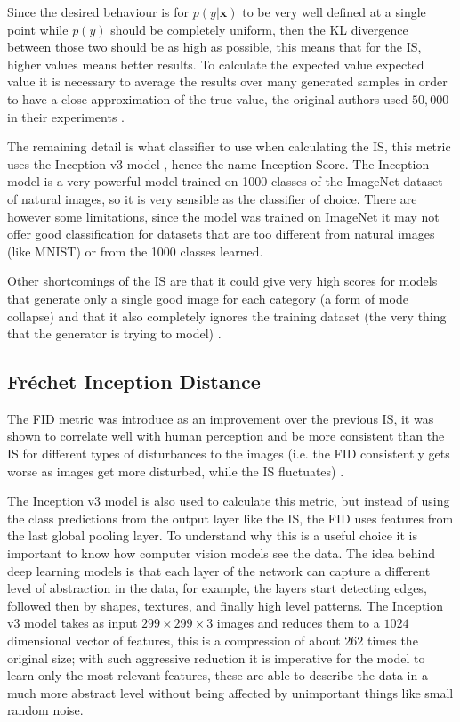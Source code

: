 Since the desired behaviour is for $p(y | \bm{x})$ to be very well defined at a single point while $p(y)$ should be completely uniform, then the KL divergence between those two should be as high as possible, this means that for the \gls{IS}, higher values means better results. To calculate the expected value expected value it is necessary to average the results over many generated samples in order to have a close approximation of the true value, the original authors used $50,000$ in their experiments \cite{improvedGANS2016}.

The remaining detail is what classifier to use when calculating the \gls{IS}, this metric uses the Inception v3 model \cite{inceptionV3_2015}, hence the name Inception Score. The Inception model is a very powerful model trained on 1000 classes of the ImageNet dataset of natural images, so it is very sensible as the classifier of choice. There are however some limitations, since the model was trained on ImageNet it may not offer good classification for datasets that are too different from natural images (like \gls{MNIST}) or from the 1000 classes learned.

Other shortcomings of the \gls{IS} are that it could give very high scores for models that generate only a single good image for each category (a form of mode collapse) and that it also completely ignores the training dataset (the very thing that the generator is trying to model) \cite{coursera_IS}.


\subsection{Fréchet Inception Distance}
The \gls{FID} metric was introduce as an improvement over the previous \gls{IS}, it was shown to correlate well with human perception and be more consistent than the \gls{IS} for different types of disturbances to the images (i.e. the \gls{FID} consistently gets worse as images get more disturbed, while the \gls{IS} fluctuates) \cite{TTUR_FID2017}.

The Inception v3 model is also used to calculate this metric, but instead of using the class predictions from the output layer like the \gls{IS}, the \gls{FID} uses features from the last global pooling layer. To understand why this is a useful choice it is important to know how computer vision models see the data. The idea behind deep learning models is that each layer of the network can capture a different level of abstraction in the data, for example, the layers start detecting edges, followed then by shapes, textures, and finally high level patterns. The Inception v3 model takes as input $299\times299\times3$ images and reduces them to a $1024$ dimensional vector of features, this is a compression of about $262$ times the original size; with such aggressive reduction it is imperative for the model to learn only the most relevant features, these are able to describe the data in a much more abstract level without being affected by unimportant things like small random noise.


